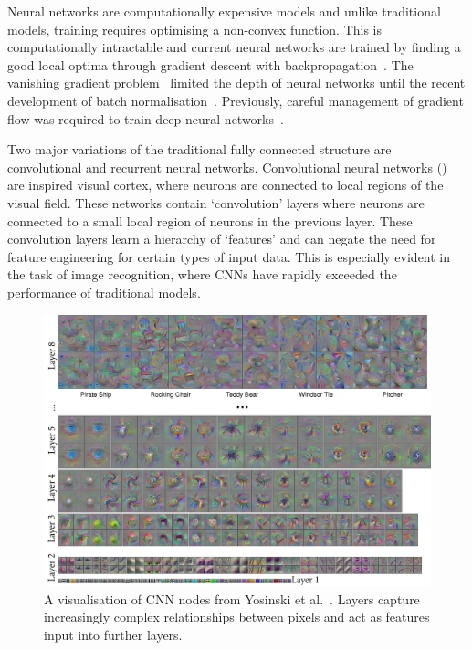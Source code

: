 \documentclass[12pt, twoside]{book}
\renewcommand\emph[1]{\textit{\color{USred}{#1}}}
\begin{document}
Neural networks are computationally expensive models and unlike traditional models, training requires optimising a non-convex function. This is computationally intractable and current neural networks are trained by finding a good local optima through gradient descent with backpropagation~\cite{convexopt}. The vanishing gradient problem~\cite{vanishinggradient} limited the depth of neural networks until the recent development of batch normalisation~\cite{batchnorm}. Previously, careful management of gradient flow was required to train deep neural networks~\cite{googlenet}. 

Two major variations of the traditional fully connected structure are convolutional and recurrent neural networks. Convolutional neural networks (\emph{CNNs}) are inspired visual cortex, where neurons are connected to local regions of the visual field. These networks contain `convolution' layers where neurons are connected to a small local region of neurons in the previous layer. These convolution layers learn a hierarchy of `features' and can negate the need for feature engineering for certain types of input data. This is especially evident in the task of image recognition, where CNNs have rapidly exceeded the performance of traditional models.


\begin{figure}[h]
	\label{cnnvis}
	\centering\includegraphics[width=1\linewidth]{cnnvis.png}
	\caption{A visualisation of CNN nodes from Yosinski et al.~\cite{cnnvis}. Layers capture increasingly complex relationships between pixels and act as features input into further layers. }
\end{figure}
\end{document}
